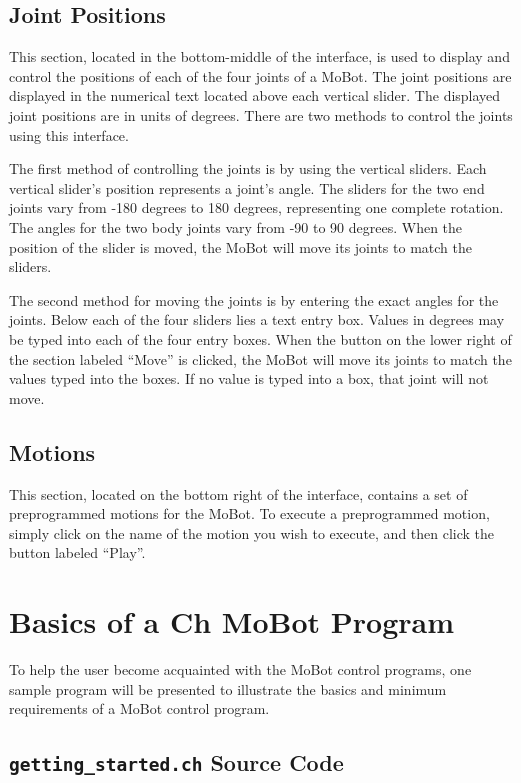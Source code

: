 \documentclass{article}
\begin{document}
\subsection{Joint Positions}
This section, located in the bottom-middle of the interface, is used to display
and control the positions of each of the four
joints of a MoBot. The joint positions are displayed in the numerical
text located above each vertical slider. The displayed joint positions are in
units of degrees.  There are two methods to control
the joints using this interface.

The first method of controlling the joints is by using the vertical sliders.
Each vertical slider's position represents a joint's angle. The sliders for the
two end joints vary from -180 degrees to 180 degrees, representing one complete
rotation. The angles for the two body joints vary from -90 to 90 degrees. When
the position of the slider is moved, the MoBot will move its joints to match the 
sliders. 

The second method for moving the joints is by entering the exact angles for the
joints. Below each of the four sliders lies a text entry box. Values in degrees
may be typed into each of the four entry boxes. When the button on the lower
right of the section labeled ``Move'' is clicked, the MoBot will move its joints
to match the values typed into the boxes. If no value is typed into a box, that 
joint will not move.

\subsection{Motions}
This section, located on the bottom right of the interface, contains a set of
preprogrammed motions for the MoBot. To execute a preprogrammed motion, simply
click on the name of the motion you wish to execute, and then click the button
labeled ``Play''.

\section{Basics of a Ch MoBot Program}
To help the user become acquainted with the MoBot control programs, one sample
program will be presented to illustrate the basics and minimum requirements of
a MoBot control program. 

\subsection{\texttt{getting\_started.ch} Source Code}

\end{document}
